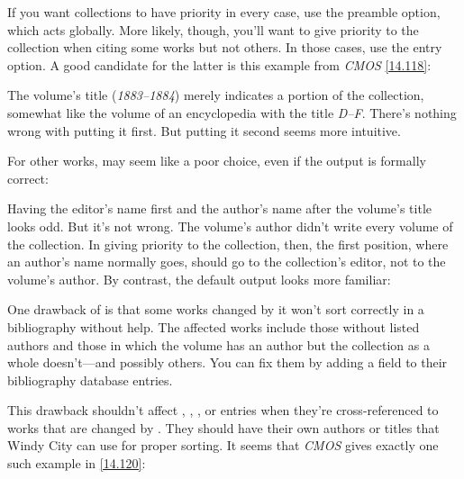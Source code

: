 \documentclass[11pt,letterpaper,oneside]{article}
\begin{document}
If you want collections to have priority in every case, use the
 preamble option, which acts globally. More likely,
though, you'll want to give priority to the collection when citing
some works but not others. In those cases, use the  entry
option. A good candidate for the latter is this example from
\textit{CMOS} \ref{14.118}:

\begin{citebib}
\item \cite*{james1963.5}
\end{citebib}

\noindent The volume's title (\textit{1883--1884}) merely indicates a
portion of the collection, somewhat like the volume of an encyclopedia
with the title \textit{D–F}. There's nothing wrong with putting it
first. But putting it second seems more intuitive.

For other works,  may seem like a poor choice, even if
the output is formally correct:

\begin{citebib}
\item \cite{barrows1959}
\end{citebib}

\noindent Having the editor's name first and the author's name after
the volume's title looks odd. But it's not wrong. The volume's author
didn't write every volume of the collection. In giving priority to the
collection, then, the first position, where an author's name normally
goes, should go to the collection's editor, not to the volume's
author. By contrast, the default output looks more familiar:

\begin{citebib}
\item \cite{barrows1959}
\end{citebib}

One drawback of  is that some works changed by it won't
sort correctly in a bibliography without help. The affected works
include those without listed authors and those in which the volume has
an author but the collection as a whole doesn't---and possibly others.
You can fix them by adding a  field to their
bibliography database entries.

This drawback shouldn't affect ,
, , or 
entries when they're cross-referenced to works that are changed by
. They should have their own authors or titles that Windy
City can use for proper sorting. It seems that \textit{CMOS} gives
exactly one such example in \ref{14.120}:
\end{document}
